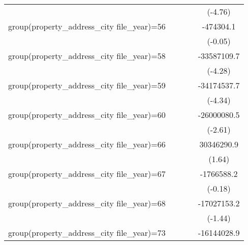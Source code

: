 {\begin{tabular}{l*{4}{c}}
                    &                     &                     &                     &     (-4.76)         \\
\addlinespace
group(property\_address\_city file\_year)=56&                     &                     &                     &   -474304.1         \\
                    &                     &                     &                     &     (-0.05)         \\
\addlinespace
group(property\_address\_city file\_year)=58&                     &                     &                     & -33587109.7\sym{***}\\
                    &                     &                     &                     &     (-4.28)         \\
\addlinespace
group(property\_address\_city file\_year)=59&                     &                     &                     & -34174537.7\sym{***}\\
                    &                     &                     &                     &     (-4.34)         \\
\addlinespace
group(property\_address\_city file\_year)=60&                     &                     &                     & -26000080.5\sym{**} \\
                    &                     &                     &                     &     (-2.61)         \\
\addlinespace
group(property\_address\_city file\_year)=66&                     &                     &                     &  30346290.9         \\
                    &                     &                     &                     &      (1.64)         \\
\addlinespace
group(property\_address\_city file\_year)=67&                     &                     &                     &  -1766588.2         \\
                    &                     &                     &                     &     (-0.18)         \\
\addlinespace
group(property\_address\_city file\_year)=68&                     &                     &                     & -17027153.2         \\
                    &                     &                     &                     &     (-1.44)         \\
\addlinespace
group(property\_address\_city file\_year)=73&                     &                     &                     & -16144028.9\sym{*}  \\

\end{tabular}}
